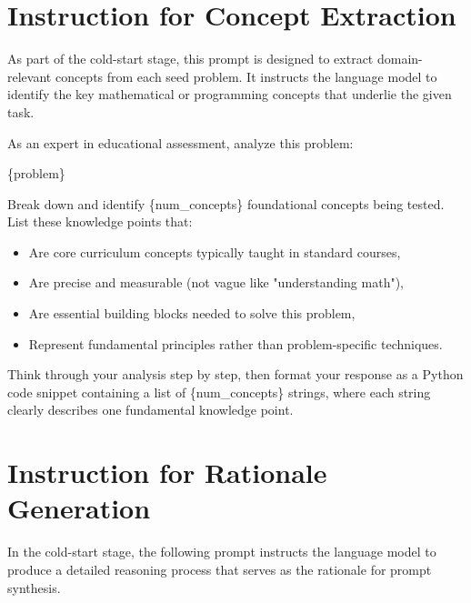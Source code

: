 \section{Instruction for Concept Extraction}
\label{app:concept_prompt}


As part of the cold-start stage, this prompt is designed to extract domain-relevant concepts from each seed problem. It instructs the language model to identify the key mathematical or programming concepts that underlie the given task.

\begin{tcolorbox}[colback=blue!5!white, colframe=blue!75!black, title=Concept Extraction Prompt]
As an expert in educational assessment, analyze this problem:

\{problem\}

Break down and identify \{num\_concepts\} foundational concepts being tested. List these knowledge points that:
\begin{itemize}
    \item Are core curriculum concepts typically taught in standard courses,
    \item Are precise and measurable (not vague like "understanding math"),
    \item Are essential building blocks needed to solve this problem,
    \item Represent fundamental principles rather than problem-specific techniques.
\end{itemize}

Think through your analysis step by step, then format your response as a Python code snippet containing a list of \{num\_concepts\} strings, where each string clearly describes one fundamental knowledge point.
\end{tcolorbox}


\section{Instruction for Rationale Generation}
\label{app:rationale_prompt}

In the cold-start stage, the following prompt instructs the language model to produce a detailed reasoning process that serves as the rationale for prompt synthesis. 

